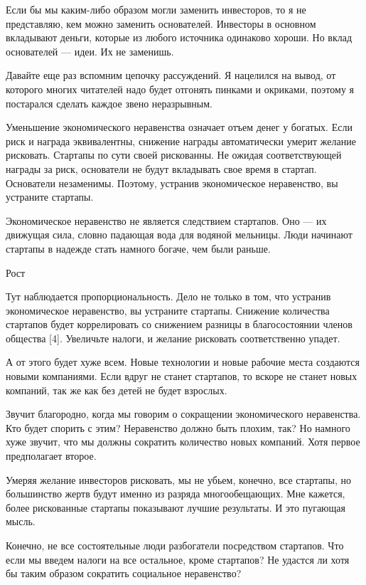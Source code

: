 \documentclass[ebook,12pt,oneside,openany]{memoir}
\begin{document}
Если бы мы каким-либо образом могли заменить инвесторов, то я не
представляю, кем можно заменить основателей. Инвесторы в основном
вкладывают деньги, которые из любого источника одинаково хороши. Но
вклад основателей — идеи. Их не заменишь.

Давайте еще раз вспомним цепочку рассуждений. Я нацелился на вывод, от
которого многих читателей надо будет отгонять пинками и окриками,
поэтому я постарался сделать каждое звено неразрывным.

Уменьшение экономического неравенства означает отъем денег у богатых.
Если риск и награда эквивалентны, снижение награды автоматически
умерит желание рисковать. Стартапы по сути своей рискованны. Не ожидая
соответствующей награды за риск, основатели не будут вкладывать свое
время в стартап. Основатели незаменимы. Поэтому, устранив
экономическое неравенство, вы устраните стартапы.

Экономическое неравенство не является следствием стартапов. Оно — их
движущая сила, словно падающая вода для водяной мельницы. Люди
начинают стартапы в надежде стать намного богаче, чем были раньше.

Рост

Тут наблюдается пропорциональность. Дело не только в том, что устранив
экономическое неравенство, вы устраните стартапы. Снижение количества
стартапов будет коррелировать со снижением разницы в благосостоянии
членов общества [4]. Увеличьте налоги, и желание рисковать
соответственно упадет.

А от этого будет хуже всем. Новые технологии и новые рабочие места
создаются новыми компаниями. Если вдруг не станет стартапов, то вскоре
не станет новых компаний, так же как без детей не будет взрослых.

Звучит благородно, когда мы говорим о сокращении экономического
неравенства. Кто будет спорить с этим? Неравенство должно быть плохим,
так? Но намного хуже звучит, что мы должны сократить количество новых
компаний. Хотя первое предполагает второе.

Умеряя желание инвесторов рисковать, мы не убьем, конечно, все
стартапы, но большинство жертв будут именно из разряда многообещающих.
Мне кажется, более рискованные стартапы показывают лучшие результаты.
И это пугающая мысль.

Конечно, не все состоятельные люди разбогатели посредством стартапов.
Что если мы введем налоги на все остальное, кроме стартапов? Не
удастся ли хотя бы таким образом сократить социальное неравенство?
\end{document}
